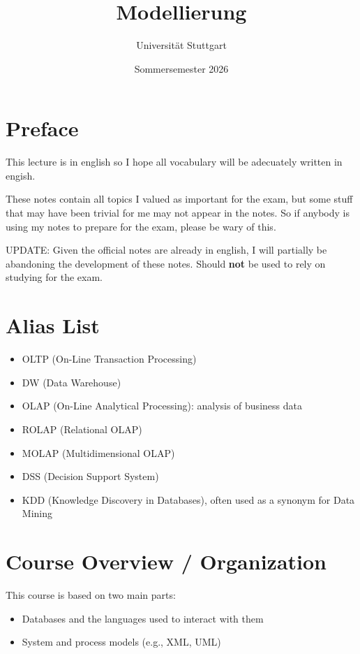 \documentclass{article}
\begin{document}
\title{Modellierung}
\date{Sommersemester 2026}
\author{Universität Stuttgart}
\maketitle
\tableofcontents
\newpage

\section{Preface}
This lecture is in english so I hope all vocabulary will be adecuately written in engish.

These notes contain all topics I valued as important for the exam, but some stuff that may have been trivial for me may not appear in the notes. So if anybody is using my notes to 
prepare for the exam, please be wary of this.

UPDATE: Given the official notes are already in english, I will partially be abandoning the development of these notes. Should \textbf{not} be used to rely on studying for the exam.
\section{Alias List}
\begin{itemize}
  \item OLTP (On-Line Transaction Processing)
  \item DW (Data Warehouse)
  \item OLAP (On-Line Analytical Processing): analysis of business data
  \item ROLAP (Relational OLAP)
  \item MOLAP (Multidimensional OLAP)
  \item DSS (Decision Support System)
  \item KDD (Knowledge Discovery in Databases), often used as a synonym for Data Mining
\end{itemize}

\section{Course Overview / Organization}
This course is based on two main parts:
\begin{itemize}
  \item Databases and the languages used to interact with them
  \item System and process models (e.g., XML, UML)
\end{itemize}
\end{document}
